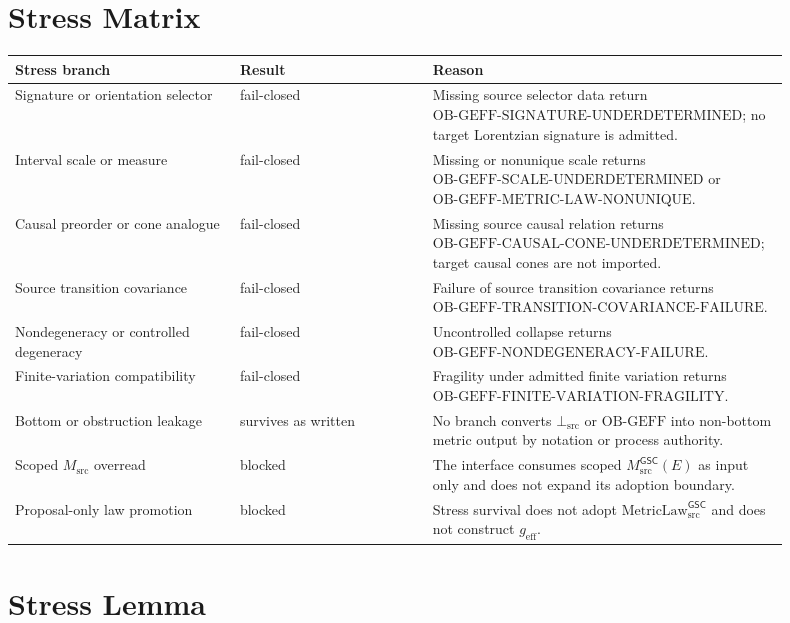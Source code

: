 \documentclass[11pt]{article}
\newcommand{\Msrc}{M_{\mathrm{src}}}
\newcommand{\MsrcGSC}{M_{\mathrm{src}}^{\mathsf{GSC}}}
\newcommand{\MetricLaw}{\mathrm{MetricLaw}_{\mathrm{src}}^{\mathsf{GSC}}}
\newcommand{\BottomSrc}{\bot_{\mathrm{src}}}
\newcommand{\geff}{g_{\mathrm{eff}}}
\begin{document}
\section{Stress Matrix}

\begin{longtable}{p{0.28\linewidth}p{0.24\linewidth}p{0.38\linewidth}}
\toprule
Stress branch & Result & Reason \\
\midrule
Signature or orientation selector & fail-closed & Missing source selector
data return \(\mathrm{OB\mbox{-}GEFF\mbox{-}SIGNATURE\mbox{-}UNDERDETERMINED}\);
no target Lorentzian signature is admitted. \\
Interval scale or measure & fail-closed & Missing or nonunique scale returns
\(\mathrm{OB\mbox{-}GEFF\mbox{-}SCALE\mbox{-}UNDERDETERMINED}\) or
\(\mathrm{OB\mbox{-}GEFF\mbox{-}METRIC\mbox{-}LAW\mbox{-}NONUNIQUE}\). \\
Causal preorder or cone analogue & fail-closed & Missing source causal
relation returns
\(\mathrm{OB\mbox{-}GEFF\mbox{-}CAUSAL\mbox{-}CONE\mbox{-}UNDERDETERMINED}\);
target causal cones are not imported. \\
Source transition covariance & fail-closed & Failure of source transition
covariance returns
\(\mathrm{OB\mbox{-}GEFF\mbox{-}TRANSITION\mbox{-}COVARIANCE\mbox{-}FAILURE}\).
\\
Nondegeneracy or controlled degeneracy & fail-closed & Uncontrolled collapse
returns \(\mathrm{OB\mbox{-}GEFF\mbox{-}NONDEGENERACY\mbox{-}FAILURE}\). \\
Finite-variation compatibility & fail-closed & Fragility under admitted
finite variation returns
\(\mathrm{OB\mbox{-}GEFF\mbox{-}FINITE\mbox{-}VARIATION\mbox{-}FRAGILITY}\).
\\
Bottom or obstruction leakage & survives as written & No branch converts
\(\BottomSrc\) or \(\mathrm{OB\mbox{-}GEFF}\) into non-bottom metric output by
notation or process authority. \\
Scoped \(\Msrc\) overread & blocked & The interface consumes scoped
\(\MsrcGSC(E)\) as input only and does not expand its adoption boundary. \\
Proposal-only law promotion & blocked & Stress survival does not adopt
\(\MetricLaw\) and does not construct \(\geff\). \\
\bottomrule
\end{longtable}

\section{Stress Lemma}
\end{document}
